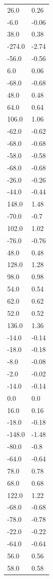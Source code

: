 \begin{longtable}{ll}
26.0 & 0.26 \\
-6.0 & -0.06 \\
38.0 & 0.38 \\
-274.0 & -2.74 \\
-56.0 & -0.56 \\
6.0 & 0.06 \\
-68.0 & -0.68 \\
48.0 & 0.48 \\
64.0 & 0.64 \\
106.0 & 1.06 \\
-62.0 & -0.62 \\
-68.0 & -0.68 \\
-58.0 & -0.58 \\
-68.0 & -0.68 \\
-26.0 & -0.26 \\
-44.0 & -0.44 \\
148.0 & 1.48 \\
-70.0 & -0.7 \\
102.0 & 1.02 \\
-76.0 & -0.76 \\
48.0 & 0.48 \\
128.0 & 1.28 \\
98.0 & 0.98 \\
54.0 & 0.54 \\
62.0 & 0.62 \\
52.0 & 0.52 \\
136.0 & 1.36 \\
-14.0 & -0.14 \\
-18.0 & -0.18 \\
-8.0 & -0.08 \\
-2.0 & -0.02 \\
-14.0 & -0.14 \\
0.0 & 0.0 \\
16.0 & 0.16 \\
-18.0 & -0.18 \\
-148.0 & -1.48 \\
-80.0 & -0.8 \\
-64.0 & -0.64 \\
78.0 & 0.78 \\
68.0 & 0.68 \\
122.0 & 1.22 \\
-68.0 & -0.68 \\
-78.0 & -0.78 \\
-22.0 & -0.22 \\
-64.0 & -0.64 \\
56.0 & 0.56 \\
58.0 & 0.58 \\

\end{longtable}
